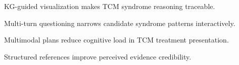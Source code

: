 \begin{highlights}
\item KG-guided visualization makes TCM syndrome reasoning traceable.
\item Multi-turn questioning narrows candidate syndrome patterns interactively.
\item Multimodal plans reduce cognitive load in TCM treatment presentation.
\item Structured references improve perceived evidence credibility.
\end{highlights}

